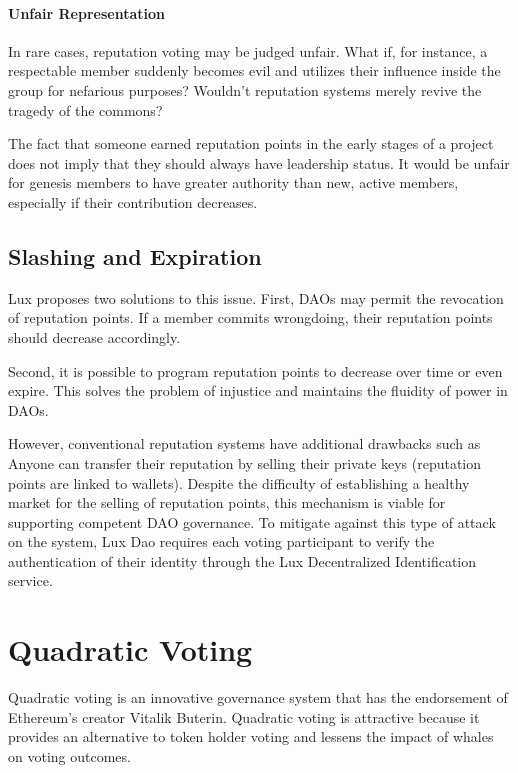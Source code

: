 \documentclass[11pt]{article}
\begin{document}
\paragraph{Unfair Representation}

In rare cases, reputation voting may be judged unfair. What if, for instance, a respectable member suddenly becomes evil and utilizes their influence inside the group for nefarious purposes? Wouldn't reputation systems merely revive the tragedy of the commons?


The fact that someone earned reputation points in the early stages of a project does not imply that they should always have leadership status. It would be unfair for genesis members to have greater authority than new, active members, especially if their contribution decreases.


\subsection{Slashing and Expiration}

Lux proposes two solutions to this issue. First, DAOs may permit the revocation of reputation points. If a member commits wrongdoing, their reputation points should decrease accordingly.


Second, it is possible to program reputation points to decrease over time or even expire. This solves the problem of injustice and maintains the fluidity of power in DAOs.


However, conventional reputation systems have additional drawbacks such as Anyone can transfer their reputation by selling their private keys (reputation points are linked to wallets). Despite the difficulty of establishing a healthy market for the selling of reputation points, this mechanism is viable for supporting competent DAO governance. To mitigate against this type of attack on the system, Lux Dao requires each voting participant to verify the authentication of their identity through the Lux Decentralized Identification service.


\section{Quadratic Voting}

Quadratic voting is an innovative governance system that has the endorsement of Ethereum's creator Vitalik Buterin. Quadratic voting is attractive because it provides an alternative to token holder voting and lessens the impact of whales on voting outcomes.
\end{document}

